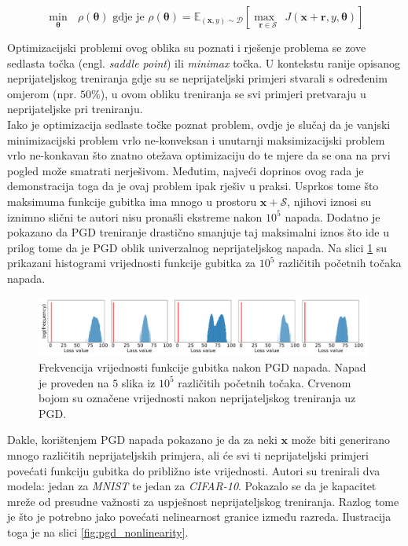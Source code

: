 \documentclass[utf8, diplomski]{fer}
\begin{document}
\begin{equation}
\underset{\boldsymbol{\theta}}{\min}\text{ }\rho(\boldsymbol{\theta}) \text{ gdje je } \rho  (\boldsymbol{\theta}) = \mathbb{E}_{(\boldsymbol{x}, y) \sim \mathcal{D}}[\underset{\boldsymbol{r} \in \mathcal{S}}{\max\text{ }} J(\boldsymbol{x} + \boldsymbol{r}, y, \boldsymbol{\theta})]
\end{equation}

Optimizacijski problemi ovog oblika su poznati i rješenje problema se zove sedlasta točka (engl. \textit{saddle point}) ili \textit{minimax} točka. U kontekstu ranije opisanog neprijateljskog treniranja gdje su se neprijateljski primjeri stvarali s određenim omjerom (npr. $50\%$), u ovom obliku treniranja se svi primjeri pretvaraju u neprijateljske pri treniranju. \\
Iako je optimizacija sedlaste točke poznat problem, ovdje je slučaj da je vanjski minimizacijski problem vrlo ne-konveksan i unutarnji maksimizacijski problem vrlo ne-konkavan što znatno otežava optimizaciju do te mjere da se ona na prvi pogled može smatrati nerješivom. Međutim, najveći doprinos ovog rada je demonstracija toga da je ovaj problem ipak rješiv u praksi. Usprkos tome što maksimuma funkcije gubitka ima mnogo u prostoru $\boldsymbol{x} + \mathcal{S}$, njihovi iznosi su iznimno slični te autori nisu pronašli ekstreme nakon $10^{5}$ napada. Dodatno je pokazano da PGD treniranje drastično smanjuje taj maksimalni iznos što ide u prilog tome da je PGD oblik univerzalnog neprijateljskog napada. Na slici \ref{fig:pgd_histogram} su prikazani histogrami vrijednosti funkcije gubitka za $10^{5}$ različitih početnih točaka napada. 

\begin{figure}[H]
\centering
\includegraphics[width=0.99\textwidth,keepaspectratio]{img/other/pgd_histogram.png}
\caption{Frekvencija vrijednosti funkcije gubitka nakon PGD napada. Napad je proveden na $5$ slika iz $10^{5}$ različitih početnih točaka. Crvenom bojom su označene vrijednosti nakon neprijateljskog treniranja uz PGD.}
\label{fig:pgd_histogram}
\end{figure}

Dakle, korištenjem PGD napada pokazano je da za neki $\boldsymbol{x}$ može biti generirano mnogo različitih neprijateljskih primjera, ali će svi ti neprijateljski primjeri povećati funkciju gubitka do približno iste vrijednosti. Autori su trenirali dva modela: jedan za \textit{MNIST} te jedan za \textit{CIFAR-10}. Pokazalo se da je kapacitet mreže od presudne važnosti za uspješnost neprijateljskog treniranja. Razlog tome je što je potrebno jako povećati nelinearnost granice između razreda. Ilustracija toga je na slici \ref{fig:pgd_nonlinearity}. 
\end{document}
